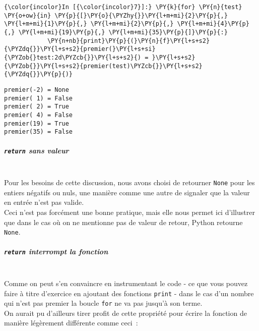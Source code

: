    \begin{Verbatim}[commandchars=\\\{\}]
{\color{incolor}In [{\color{incolor}7}]:} \PY{k}{for} \PY{n}{test} \PY{o+ow}{in} \PY{p}{[}\PY{o}{\PYZhy{}}\PY{l+m+mi}{2}\PY{p}{,} \PY{l+m+mi}{1}\PY{p}{,} \PY{l+m+mi}{2}\PY{p}{,} \PY{l+m+mi}{4}\PY{p}{,} \PY{l+m+mi}{19}\PY{p}{,} \PY{l+m+mi}{35}\PY{p}{]}\PY{p}{:}
            \PY{n+nb}{print}\PY{p}{(}\PY{n}{f}\PY{l+s+s2}{\PYZdq{}}\PY{l+s+s2}{premier(}\PY{l+s+si}{\PYZob{}test:2d\PYZcb{}}\PY{l+s+s2}{) = }\PY{l+s+s2}{\PYZob{}}\PY{l+s+s2}{premier(test)\PYZcb{}}\PY{l+s+s2}{\PYZdq{}}\PY{p}{)}
\end{Verbatim}


    \begin{Verbatim}[commandchars=\\\{\}]
premier(-2) = None
premier( 1) = False
premier( 2) = True
premier( 4) = False
premier(19) = True
premier(35) = False

    \end{Verbatim}

    \hypertarget{return-sans-valeur}{%
\subparagraph{\texorpdfstring{\texttt{return} sans
valeur}{return sans valeur}\\\\}\label{return-sans-valeur}}

    Pour les besoins de cette discussion, nous avons choisi de retourner
\texttt{None} pour les entiers négatifs ou nuls, une manière comme une
autre de signaler que la valeur en entrée n'est pas valide.\\

Ceci n'est pas forcément une bonne pratique, mais elle nous permet ici
d'illustrer que dans le cas où on ne mentionne pas de valeur de retour,
Python retourne \texttt{None}.

    \hypertarget{return-interrompt-la-fonction}{%
\subparagraph{\texorpdfstring{\texttt{return} interrompt la
fonction}{return interrompt la fonction}\\\\}\label{return-interrompt-la-fonction}}

    Comme on peut s'en convaincre en instrumentant le code - ce que vous
pouvez faire à titre d'exercice en ajoutant des fonctions \texttt{print}
- dans le cas d'un nombre qui n'est pas premier la boucle \texttt{for}
ne va pas jusqu'à son terme.\\

    On aurait pu d'ailleurs tirer profit de cette propriété pour écrire la
fonction de manière légèrement différente comme ceci~:

